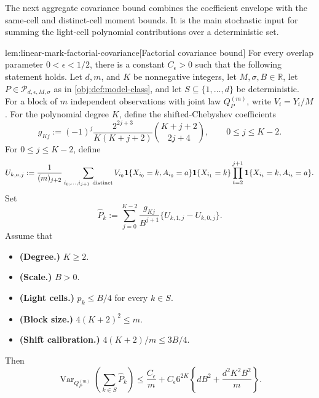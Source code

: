 \documentclass[11pt]{article}
\begin{document}
The next aggregate covariance bound combines the coefficient envelope with the same-cell and distinct-cell moment bounds. It is the main stochastic input for summing the light-cell polynomial contributions over a deterministic set.

\begin{lemmav}{lem:linear-mark-factorial-covariance}[Factorial covariance bound]
For every overlap parameter \(0<\epsilon<1/2\), there is a constant \(C_{\epsilon}>0\) such that the following statement holds.  Let \(d,m\), and \(K\) be nonnegative integers, let \(M,\sigma,B\in\mathbb R\), let \(P\in\mathcal P_{d,\epsilon,M,\sigma}\) as in \cref{obj:def:model-class}, and let \(S\subseteq\{1,\ldots,d\}\) be deterministic.  For a block of \(m\) independent observations with joint law \(Q_P^{(m)}\), write \(V_i=Y_i/M\).  For the polynomial degree \(K\), define the shifted-Chebyshev coefficients
\[
g_{Kj}
:=
(-1)^j\frac{2^{2j+3}}{K(K+j+2)}
\binom{K+j+2}{2j+4},
\qquad 0\le j\le K-2.
\]
For \(0\le j\le K-2\), define
\[
U_{k,a,j}
:=
\frac{1}{(m)_{j+2}}
\sum_{i_0,\ldots,i_{j+1}\ {\rm distinct}}
V_{i_0}\mathbf 1\{X_{i_0}=k,A_{i_0}=a\}
\mathbf 1\{X_{i_1}=k\}
\prod_{t=2}^{j+1}\mathbf 1\{X_{i_t}=k,A_{i_t}=a\}.
\]
Set
\[
\widehat P_k
:=
\sum_{j=0}^{K-2}
\frac{g_{Kj}}{B^{j+1}}
\{U_{k,1,j}-U_{k,0,j}\}.
\]
Assume that
\begin{itemize}
\item \textbf{(Degree.)} \(K\ge 2\).
\item \textbf{(Scale.)} \(B>0\).
\item \textbf{(Light cells.)} \(p_k\le B/4\) for every \(k\in S\).
\item \textbf{(Block size.)} \(4(K+2)^2\le m\).
\item \textbf{(Shift calibration.)} \(4(K+2)/m\le 3B/4\).
\end{itemize}
Then
\[
\operatorname{Var}_{Q_P^{(m)}}\!\left(\sum_{k\in S}\widehat P_k\right)
\le
\frac{C_{\epsilon}}{m}
+
C_{\epsilon}6^{2K}
\left\{
dB^2+\frac{d^2K^2B^2}{m}
\right\}.
\]
\end{lemmav}
\end{document}
